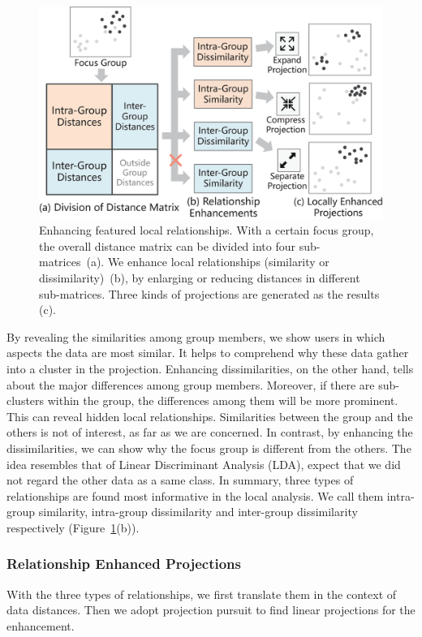 \begin{figure}[htbp]
\centering
\includegraphics[width=1\linewidth]{images/enhancement1.eps}
  \caption{Enhancing featured local relationships. With a certain focus group, the overall distance matrix can be divided into four sub-matrices~(a). We enhance local relationships (similarity or dissimilarity)~(b), by enlarging or reducing distances in different sub-matrices. Three kinds of projections are generated as the results (c).}
\label{fig:local_relationships}
  \end{figure}

By revealing the similarities among group members, we show users in which aspects the data are most similar. It helps to comprehend why these data gather into a cluster in the projection. Enhancing dissimilarities, on the other hand, tells about the major differences among group members. Moreover, if there are sub-clusters within the group, the differences among them will be more prominent. This can reveal hidden local relationships.  Similarities between the group and the others is not of interest, as far as we are concerned. In contrast, by enhancing the dissimilarities, we can show why the focus group is different from the others. The idea resembles that of Linear Discriminant Analysis (LDA), expect that we did not regard the other data as a same class. In summary, three types of relationships are found most informative in the local analysis. We call them intra-group similarity, intra-group dissimilarity and inter-group dissimilarity respectively (Figure~\ref{fig:local_relationships}(b)).

\subsubsection{Relationship Enhanced Projections}
\label{subsubsection:relationship_enhancement}
With the three types of relationships, we first translate them in the context of data distances. Then we adopt projection pursuit to find linear projections for the enhancement.

